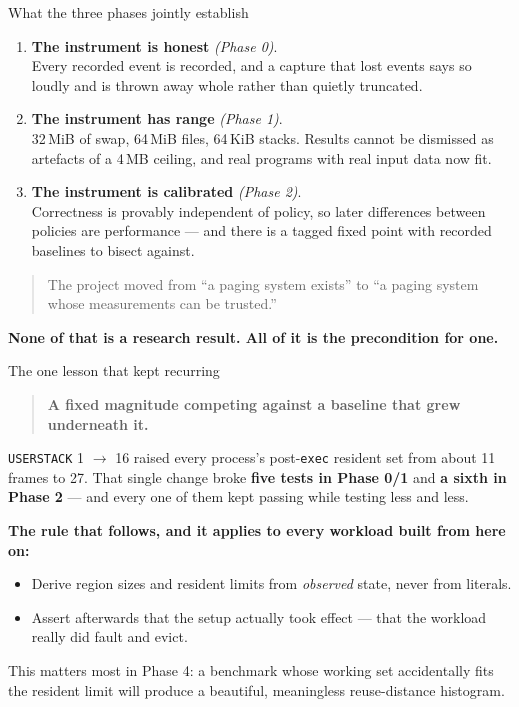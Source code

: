 \documentclass[10pt,aspectratio=169]{beamer}
\begin{document}
\begin{frame}{What the three phases jointly establish}
  \small
  \begin{enumerate}
    \item \textbf{The instrument is honest} \emph{(Phase 0)}.\\
      Every recorded event is recorded, and a capture that lost events says so
      loudly and is thrown away whole rather than quietly truncated.

    \smallskip
    \item \textbf{The instrument has range} \emph{(Phase 1)}.\\
      32\,MiB of swap, 64\,MiB files, 64\,KiB stacks. Results cannot be
      dismissed as artefacts of a 4\,MB ceiling, and real programs with real
      input data now fit.

    \smallskip
    \item \textbf{The instrument is calibrated} \emph{(Phase 2)}.\\
      Correctness is provably independent of policy, so later differences
      between policies are performance --- and there is a tagged fixed point
      with recorded baselines to bisect against.
  \end{enumerate}

  \medskip
  \begin{quote}
    The project moved from ``a paging system exists'' to ``a paging system
    whose measurements can be trusted.''
  \end{quote}

  \textbf{None of that is a research result. All of it is the precondition for
  one.}
\end{frame}

\begin{frame}{The one lesson that kept recurring}
  \small
  \begin{quote}
    \large
    \textbf{A fixed magnitude competing against a baseline that grew
    underneath it.}
  \end{quote}

  \medskip
  \texttt{USERSTACK} 1 $\to$ 16 raised every process's post-\texttt{exec}
  resident set from about 11 frames to 27. That single change broke
  \textbf{five tests in Phase 0/1} and \textbf{a sixth in Phase 2} --- and
  \alert{every one of them kept passing} while testing less and less.

  \medskip
  \textbf{The rule that follows, and it applies to every workload built from
  here on:}
  \begin{itemize}
    \item Derive region sizes and resident limits from \emph{observed} state,
          never from literals.
    \item Assert afterwards that the setup actually took effect --- that the
          workload really did fault and evict.
  \end{itemize}

  \medskip
  This matters most in Phase 4: a benchmark whose working set accidentally fits
  the resident limit will produce a beautiful, meaningless reuse-distance
  histogram.
\end{frame}
\end{document}

